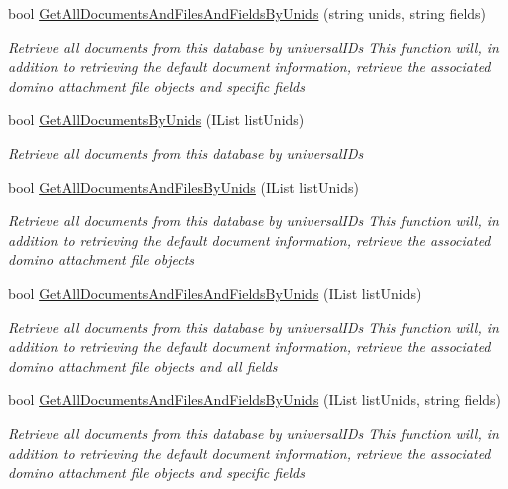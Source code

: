 \begin{DoxyCompactItemize}
bool \mbox{\hyperlink{class_database_object_a0e6ff0557f91850aee2d5bf77ba7fc82}{Get\+All\+Documents\+And\+Files\+And\+Fields\+By\+Unids}} (string unids, string fields)
\begin{DoxyCompactList}\small\item\em Retrieve all documents from this database by universal\+I\+Ds This function will, in addition to retrieving the default document information, retrieve the associated domino attachment file objects and specific fields \end{DoxyCompactList}\item 
bool \mbox{\hyperlink{class_database_object_a92e80ea30e83cddf47f29d0f502b81c5}{Get\+All\+Documents\+By\+Unids}} (I\+List list\+Unids)
\begin{DoxyCompactList}\small\item\em Retrieve all documents from this database by universal\+I\+Ds \end{DoxyCompactList}\item 
bool \mbox{\hyperlink{class_database_object_aa69262a50977a28a2decf400d1eedd20}{Get\+All\+Documents\+And\+Files\+By\+Unids}} (I\+List list\+Unids)
\begin{DoxyCompactList}\small\item\em Retrieve all documents from this database by universal\+I\+Ds This function will, in addition to retrieving the default document information, retrieve the associated domino attachment file objects \end{DoxyCompactList}\item 
bool \mbox{\hyperlink{class_database_object_a9eb9436d27f446982f0ec4ddce49e843}{Get\+All\+Documents\+And\+Files\+And\+Fields\+By\+Unids}} (I\+List list\+Unids)
\begin{DoxyCompactList}\small\item\em Retrieve all documents from this database by universal\+I\+Ds This function will, in addition to retrieving the default document information, retrieve the associated domino attachment file objects and all fields \end{DoxyCompactList}\item 
bool \mbox{\hyperlink{class_database_object_aaf0f7fbe6f346bfc24b3844610c3e8f3}{Get\+All\+Documents\+And\+Files\+And\+Fields\+By\+Unids}} (I\+List list\+Unids, string fields)
\begin{DoxyCompactList}\small\item\em Retrieve all documents from this database by universal\+I\+Ds This function will, in addition to retrieving the default document information, retrieve the associated domino attachment file objects and specific fields \end{DoxyCompactList}\item 

\end{DoxyCompactItemize}
